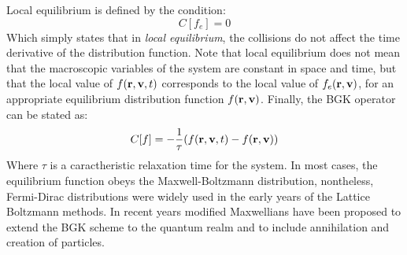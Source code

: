 Local equilibrium is defined by the condition:
\begin{equation}
C[f_e] = 0
\end{equation}
Which simply states that in \emph{local equilibrium}, the collisions do not affect the time derivative of the distribution function. Note that local equilibrium does not mean that the macroscopic variables of the system are constant in space and time, but that the local value of  $\f$ corresponds to the local value of $f_e(\rv)$, for an appropriate equilibrium distribution function $f(\rv)$. Finally, the BGK operator can be stated as:
\begin{equation}
C[f] = -\frac{1}{\tau}(\f - f(\rv))
\end{equation}
Where $\tau$ is a caractheristic relaxation time for the system. In most cases, the equilibrium function obeys the Maxwell-Boltzmann distribution, nontheless, Fermi-Dirac distributions were widely used in the early years of the Lattice Boltzmann methods.
In recent years modified Maxwellians have been proposed to extend the BGK scheme to the quantum realm\cite{2010arXiv1009.3352F} and to include annihilation and creation of particles. 












